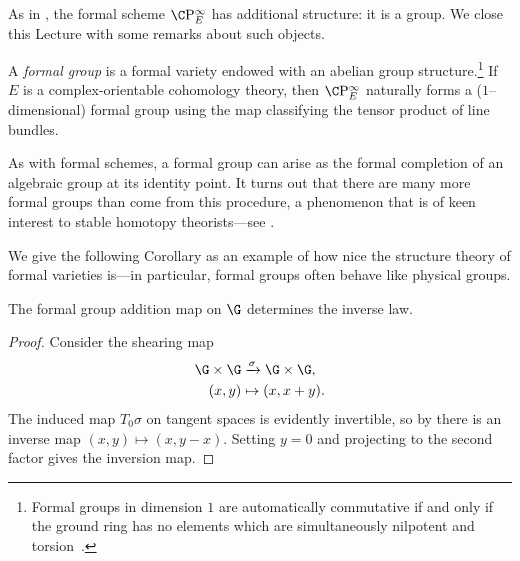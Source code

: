 As in , the formal scheme \(\CP^\infty_E\) has additional structure: it is a group.  We close this Lecture with some remarks about such objects.

\begin{definition}\label{DefnFormalGps}
A \textit{formal group} is a formal variety endowed with an abelian group structure.\footnote{Formal groups in dimension \(1\) are automatically commutative if and only if the ground ring has no elements which are simultaneously nilpotent and torsion~\cite[Theorem I.6.1]{Hazewinkel}.}  If \(E\) is a complex-orientable cohomology theory, then \(\CP^\infty_E\) naturally forms a (\(1\)--dimensional) formal group using the map classifying the tensor product of line bundles.
\end{definition}

\begin{remark}
As with formal schemes, a formal group can arise as the formal completion of an algebraic group at its identity point.  It turns out that there are many more formal groups than come from this procedure, a phenomenon that is of keen interest to stable homotopy theorists---see .
\end{remark}

We give the following Corollary as an example of how nice the structure theory of formal varieties is---in particular, formal groups often behave like physical groups.

\begin{corollary}
The formal group addition map on \(\G\) determines the inverse law.
\end{corollary}
\begin{proof}
Consider the shearing map
\begin{align*}
\G \times \G & \xrightarrow{\sigma} \G \times \G, \\
(x, y) & \mapsto (x, x + y).
\end{align*}
The induced map \(T_0 \sigma\) on tangent spaces is evidently invertible, so by  there is an inverse map \((x, y) \mapsto (x, y - x)\).  Setting \(y = 0\) and projecting to the second factor gives the inversion map.
\end{proof}



